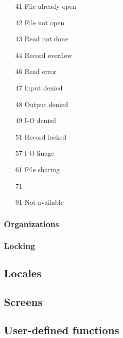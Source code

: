 \begin{enumerate}
\item[41] File already open
\item[42] File not open
\item[43] Read not done
\item[44] Record overflow
\item[46] Read error
\item[47] Input denied
\item[48] Output denied
\item[49] I-O denied
\end{enumerate}

\begin{enumerate}
\item[51] Record locked
\item[57] I-O linage
\end{enumerate}

\begin{enumerate}
\item[61] File sharing
\end{enumerate}

\begin{enumerate}
\item[71] 
\end{enumerate}

\begin{enumerate}
\item[91] Not available
\end{enumerate}

\subsubsection{Organizations}

\subsubsection{Locking}

\subsection{Locales}

\subsection{Screens}

\subsection{User-defined functions}


